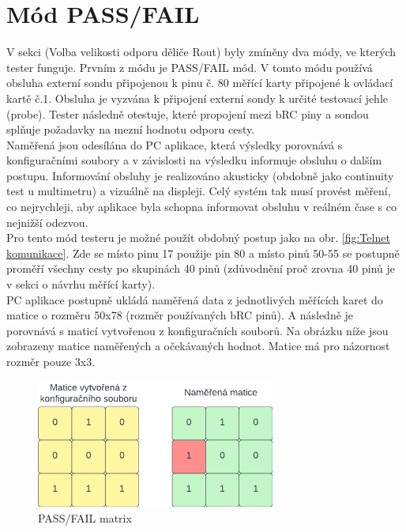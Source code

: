 \section{Mód PASS/FAIL}
V sekci (Volba velikosti odporu děliče Rout) byly zmíněny dva módy, ve kterých tester funguje.
Prvním z módu je PASS/FAIL mód. V tomto módu používá obsluha externí sondu připojenou k pinu č. 80
měřící karty připojené k ovládací kartě č.1. Obsluha je vyzvána k připojení externí sondy k 
určité testovací jehle (probe). Tester následně otestuje, které propojení mezi bRC piny a sondou splňuje požadavky
na mezní hodnotu odporu cesty.\\

Naměřená jsou odesílána do PC aplikace, která výsledky porovnává
s konfiguračními soubory a v závislosti na výsledku informuje obsluhu o dalším postupu.
Informování obsluhy je realizováno akusticky (obdobně jako continuity test u multimetru)
a vizuálně na displeji. Celý systém tak musí provést měření, co nejrychleji, aby aplikace byla schopna informovat
obsluhu v reálném čase s co nejnižší odezvou.\\

Pro tento mód testeru je možné použít obdobný postup jako na obr. \ref{fig:Telnet komunikace}.
Zde se místo pinu 17 použije pin 80 a místo pinů 50-55 se postupně proměří všechny cesty po skupinách
40 pinů (zdůvodnění proč zrovna 40 pinů je v sekci o návrhu měřící karty).\\

PC aplikace postupně ukládá naměřená data z jednotlivých měřících karet do matice o rozměru 50x78 (rozměr používaných bRC pinů).
A následně je porovnává s maticí vytvořenou z konfiguračních souborů. Na obrázku níže jsou zobrazeny matice naměřených
a očekávaných hodnot. Matice má pro názornost rozměr pouze 3x3.

\begin{figure}[ht!]
    \centering
    \includegraphics[width = 0.7\textwidth]{obrazky/MATRIX_COMPARISSON.png}
    \caption{PASS/FAIL matrix}
    \label{fig:PASS/FAIL matrix}
\end{figure}

